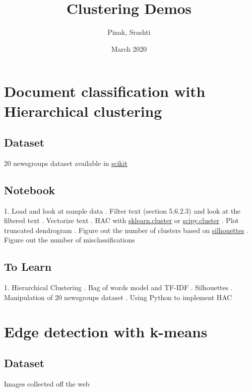 \documentclass{article}
\title{Clustering Demos}
\author{Pinak, Srashti }
\date{March 2020}
\begin{document}
\maketitle

\section*{Document classification with Hierarchical clustering}
\subsection*{Dataset}
20 newsgroups dataset available in  \href{https://scikit-learn.org/0.19/datasets/twenty_newsgroups.html}{scikit}
\subsection*{Notebook}
1. Load and look at sample data
. Filter text (section 5.6.2.3) and look at the filtered text
. Vectorize text
. HAC with \href{https://scikit-learn.org/stable/modules/generated/sklearn.cluster.AgglomerativeClustering.html}{sklearn.cluster} or \href{https://joernhees.de/blog/2015/08/26/scipy-hierarchical-clustering-and-dendrogram-tutorial/}{scipy.cluster}
. Plot truncated dendrogram
. Figure out the number of clusters based on \href{https://en.wikipedia.org/wiki/Silhouette_(clustering)}{silhouettes}
. Figure out the number of misclassifications
\subsection*{To Learn}
1. Hierarchical Clustering
. Bag of words model and TF-IDF
. Silhouettes
. Manipulation of 20 newsgroups dataset
. Using Python to implement HAC
\section*{Edge detection with k-means}
\subsection*{Dataset} Images collected off the web
\end{document}
